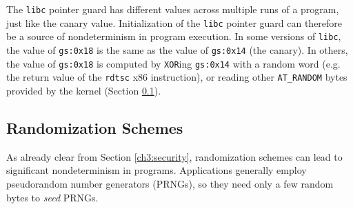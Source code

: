 The \texttt{libc} pointer guard has different values
across multiple runs of a program, just like the canary
value. Initialization of the \texttt{libc} pointer guard can 
therefore be a source of nondeterminism in program execution. 
In some versions of \texttt{libc}, the value of \texttt{gs:0x18} is the same
as the value of \texttt{gs:0x14} (the canary). In others,
the value of \texttt{gs:0x18} is computed by \texttt{XOR}ing \texttt{gs:0x14} with 
a random word (e.g. the return value of the \texttt{rdtsc} x86 instruction),
or reading other \texttt{AT\_RANDOM} bytes provided by the kernel
 (Section \ref{ch3:rand}).

\subsection{Randomization Schemes} \label{ch3:rand}
As already clear from Section \ref{ch3:security}, 
randomization schemes can lead to significant nondeterminism 
in programs. Applications generally employ pseudorandom number
generators (PRNGs), so they need only a few random
bytes to {\em seed} PRNGs. 

